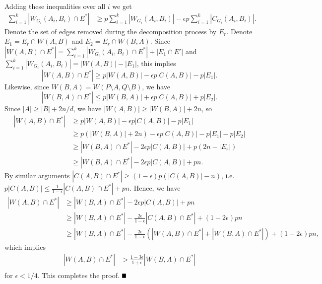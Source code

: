 \documentclass[11pt]{article}
\newcommand{\qed}{\mbox{}\hspace*{\fill}\nolinebreak\mbox{$\rule{0.6em}{0.6em}$}
}
\newcommand{\e}{{\epsilon}}
\newenvironment{proof}{{\bf Proof:}}{$\qed$\par}
\begin{document}
\begin{proof}
Adding these inequalities over all $i$ we get
\begin{equation}
\begin{split}
\sum_{i=1}^k|W_{G_i}(A_i, B_i)\cap E^*|&\geq p \sum_{i=1}^k|W_{G_i}(A_i, B_i)|-\e p\sum_{i=1}^k|C_{G_i}(A_i, B_i)|.
\end{split}
\end{equation}
Denote the set of edges removed  during the decomposition process by $E_r$. Denote $E_1=E_r\cap W(A, B)$ and $E_2=E_r\cap W(B, A)$. Since $|W(A, B)\cap E^*|=\sum_{i=1}^k|W_{G_i}(A_i, B_i)\cap E^*|+|E_1\cap E'|$ and $\sum_{i=1}^k|W_{G_i}(A_i, B_i)|=|W(A, B)|-|E_1|$, this implies
\begin{equation*}
|W(A, B)\cap E^*| \geq p |W(A, B)|-\e p |C(A, B)|-p|E_1|.
\end{equation*}
Likewise, since $W(B, A)=W(P\setminus A, Q\setminus B)$, we have
\begin{equation*}
|W(B, A)\cap E^*| \leq p |W(B, A)|+\e p |C(A, B)|+p|E_2|.
\end{equation*}
Since $|A|\geq |B|+2n/d$, we have $|W(A, B)|\geq |W(B, A)|+2n$, so 
\begin{equation*}
\begin{split}
|W(A, B)\cap E^*| &\geq p |W(A, B)|-\e p |C(A, B)|-p|E_1|\\
&\geq p (|W(B, A)|+2n)-\e p |C(A, B)|-p|E_1|-p|E_2|\\
&\geq |W(B, A)\cap E^*|-2\e p |C(A, B)|+p(2n-|E_r|)\\
&\geq |W(B, A)\cap E^*|-2\e p |C(A, B)|+pn.
\end{split}
\end{equation*}
By similar arguments $|C(A, B)\cap E^*|\geq (1-\e)p(|C(A, B)|-n)$, i.e. $p|C(A, B)|\leq \frac1{1-\e}|C(A, B)\cap E^*|+pn$. Hence, we have
\begin{equation*}
\begin{split}
|W(A, B)\cap E^*| &\geq |W(B, A)\cap E^*|-2\e p |C(A, B)|+pn\\
&\geq |W(B, A)\cap E^*|-\frac{2\e}{1-\e}|C(A, B)\cap E^*|+(1-2\e)pn\\
&\geq |W(B, A)\cap E^*|-\frac{2\e}{1-\e}\left(|W(A, B)\cap E^*|+|W(B, A)\cap E^*|\right)+(1-2\e) pn,
\end{split}
\end{equation*}
which implies
\begin{equation*}
\begin{split}
|W(A, B)\cap E^*| &>\frac{1-3\e}{1+\e}|W(B, A)\cap E^*|\\
\end{split}
\end{equation*}
for $\e<1/4$. This completes the proof.
\end{proof}
\end{document}
